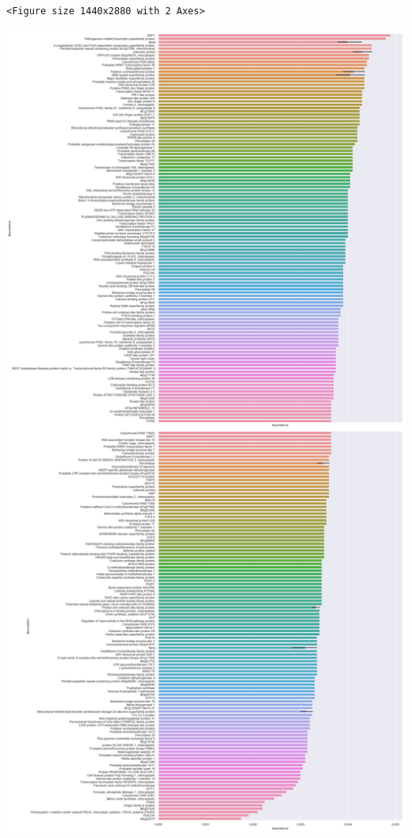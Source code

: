 \documentclass[11pt]{article}
\begin{document}
\begin{verbatim}
<Figure size 1440x2880 with 2 Axes>
\end{verbatim}


\begin{center}
\includegraphics[width=.9\linewidth]{obipy-resources/93e2fbf76ed477962282ae99767b8408de4d3ed9/69bf10916878bd9338319e6d6934a10bcca2934b.png}
\end{center}
\end{document}
